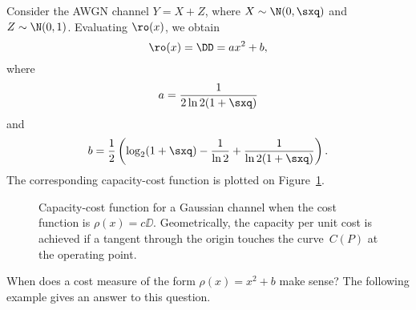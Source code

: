 \begin{example}
  Consider the AWGN channel $Y=X+Z$, where $X \sim \N(0,\sxq)$ and $Z \sim
  \N(0,1)$. Evaluating $\ro(x)$, we obtain
  \[ \ro(x) = \DD = ax^2 + b, \]
  where
  \[ a = \frac{1}{2 \ln2 (1+\sxq)} \]
  and
  \[ b = \frac12 \left( \log_2(1+\sxq) - \frac{1}{\ln2} +
  \frac{1}{\ln 2 (1+\sxq)} \right). \]
  The corresponding capacity-cost function is plotted on
  Figure~\ref{fig:gausscap}.
  \begin{figure}
    \begin{center}
    \end{center}
    \caption{Capacity-cost function for a Gaussian channel when the cost
    function is $\rho(x) = c \DD$. Geometrically, the capacity per unit cost is
    achieved if a tangent through the origin touches the curve~$C(P)$ at the
    operating point.}
    \label{fig:gausscap}
  \end{figure}
\end{example}

%
When does a cost measure of the form $\rho(x) = x^2 + b$ make sense? The following
example gives an answer to this question. 

